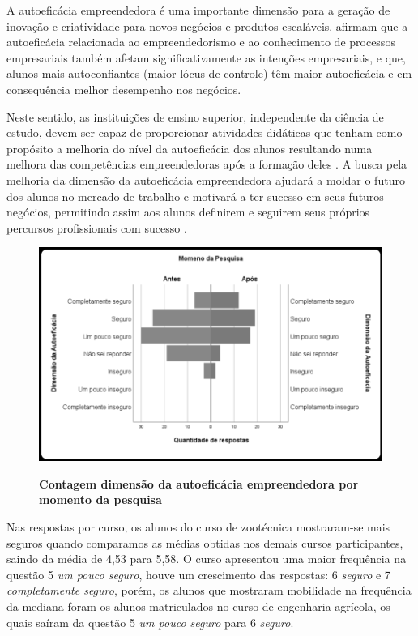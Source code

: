 A autoeficácia empreendedora é uma importante dimensão para a geração de inovação e criatividade para novos negócios e produtos escaláveis.  afirmam que a autoeficácia relacionada ao empreendedorismo e ao conhecimento de processos empresariais também afetam significativamente as intenções empresariais, e que, alunos mais autoconfiantes (maior lócus de controle) têm maior autoeficácia e em consequência melhor desempenho nos negócios.

Neste sentido, as instituições de ensino superior, independente da ciência de estudo, devem ser capaz de proporcionar atividades didáticas que tenham como propósito a melhoria do nível da autoeficácia dos alunos resultando numa melhora das competências empreendedoras após a formação deles \cite{ribeiro_autoeficacia_2019}. A busca pela melhoria da dimensão da autoeficácia empreendedora ajudará a moldar o futuro dos alunos no mercado de trabalho e motivará a ter sucesso em seus futuros negócios, permitindo assim aos alunos definirem e seguirem seus próprios percursos profissionais com sucesso \cite{das_examining_2018}.

\begin{figure}[H]
\centering
\caption{\textbf{
Contagem dimensão da autoeficácia empreendedora  por momento da pesquisa}}
\includegraphics[scale=0.5]{Imagens/histograma_autoeficacia_antes.png}
\label{figura_autoeficacia}
\end{figure}


Nas respostas por curso, os alunos do curso de zootécnica mostraram-se mais seguros quando comparamos as médias obtidas nos demais cursos participantes, saindo da média de 4,53 para 5,58. O curso apresentou uma maior frequência na questão 5 \textit{um pouco seguro}, houve um crescimento das respostas: 6 \textit{seguro} e 7 \textit{completamente seguro}, porém, os alunos que mostraram mobilidade na frequência da mediana foram os alunos matriculados no curso de engenharia agrícola, os quais saíram da questão 5 \textit{um pouco seguro} para 6 \textit{seguro}.


